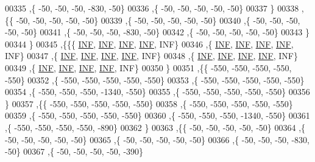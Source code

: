 \begin{DoxyCode}
00335   ,\{   -50,   -50,   -50,  -830,   -50\}
00336   ,\{   -50,   -50,   -50,   -50,   -50\}
00337   \}
00338  ,\{\{   -50,   -50,   -50,   -50,   -50\}
00339   ,\{   -50,   -50,   -50,   -50,   -50\}
00340   ,\{   -50,   -50,   -50,   -50,   -50\}
00341   ,\{   -50,   -50,   -50,  -830,   -50\}
00342   ,\{   -50,   -50,   -50,   -50,   -50\}
00343   \}
00344  \}
00345 ,\{\{\{   \hyperlink{energy__const_8h_a12c2040f25d8e3a7b9e1c2024c618cb6}{INF},   \hyperlink{energy__const_8h_a12c2040f25d8e3a7b9e1c2024c618cb6}{INF},   \hyperlink{energy__const_8h_a12c2040f25d8e3a7b9e1c2024c618cb6}{INF},   \hyperlink{energy__const_8h_a12c2040f25d8e3a7b9e1c2024c618cb6}{INF},   INF\}
00346   ,\{   \hyperlink{energy__const_8h_a12c2040f25d8e3a7b9e1c2024c618cb6}{INF},   \hyperlink{energy__const_8h_a12c2040f25d8e3a7b9e1c2024c618cb6}{INF},   \hyperlink{energy__const_8h_a12c2040f25d8e3a7b9e1c2024c618cb6}{INF},   \hyperlink{energy__const_8h_a12c2040f25d8e3a7b9e1c2024c618cb6}{INF},   INF\}
00347   ,\{   \hyperlink{energy__const_8h_a12c2040f25d8e3a7b9e1c2024c618cb6}{INF},   \hyperlink{energy__const_8h_a12c2040f25d8e3a7b9e1c2024c618cb6}{INF},   \hyperlink{energy__const_8h_a12c2040f25d8e3a7b9e1c2024c618cb6}{INF},   \hyperlink{energy__const_8h_a12c2040f25d8e3a7b9e1c2024c618cb6}{INF},   INF\}
00348   ,\{   \hyperlink{energy__const_8h_a12c2040f25d8e3a7b9e1c2024c618cb6}{INF},   \hyperlink{energy__const_8h_a12c2040f25d8e3a7b9e1c2024c618cb6}{INF},   \hyperlink{energy__const_8h_a12c2040f25d8e3a7b9e1c2024c618cb6}{INF},   \hyperlink{energy__const_8h_a12c2040f25d8e3a7b9e1c2024c618cb6}{INF},   INF\}
00349   ,\{   \hyperlink{energy__const_8h_a12c2040f25d8e3a7b9e1c2024c618cb6}{INF},   \hyperlink{energy__const_8h_a12c2040f25d8e3a7b9e1c2024c618cb6}{INF},   \hyperlink{energy__const_8h_a12c2040f25d8e3a7b9e1c2024c618cb6}{INF},   \hyperlink{energy__const_8h_a12c2040f25d8e3a7b9e1c2024c618cb6}{INF},   INF\}
00350   \}
00351  ,\{\{  -550,  -550,  -550,  -550,  -550\}
00352   ,\{  -550,  -550,  -550,  -550,  -550\}
00353   ,\{  -550,  -550,  -550,  -550,  -550\}
00354   ,\{  -550,  -550,  -550, -1340,  -550\}
00355   ,\{  -550,  -550,  -550,  -550,  -550\}
00356   \}
00357  ,\{\{  -550,  -550,  -550,  -550,  -550\}
00358   ,\{  -550,  -550,  -550,  -550,  -550\}
00359   ,\{  -550,  -550,  -550,  -550,  -550\}
00360   ,\{  -550,  -550,  -550, -1340,  -550\}
00361   ,\{  -550,  -550,  -550,  -550,  -890\}
00362   \}
00363  ,\{\{   -50,   -50,   -50,   -50,   -50\}
00364   ,\{   -50,   -50,   -50,   -50,   -50\}
00365   ,\{   -50,   -50,   -50,   -50,   -50\}
00366   ,\{   -50,   -50,   -50,  -830,   -50\}
00367   ,\{   -50,   -50,   -50,   -50,  -390\}

\end{DoxyCode}

